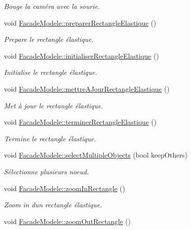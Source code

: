 \begin{DoxyCompactItemize}
\begin{DoxyCompactList}\small\item\em Bouge la caméra avec la sourie. \end{DoxyCompactList}\item 
void \hyperlink{group__inf2990_gaa5ea001f334158926e6c701478926ae9}{Facade\+Modele\+::preparer\+Rectangle\+Elastique} ()
\begin{DoxyCompactList}\small\item\em Prepare le rectangle élastique. \end{DoxyCompactList}\item 
void \hyperlink{group__inf2990_ga6ccf25bd92d3bae6dfeebaf051c768f4}{Facade\+Modele\+::initialiser\+Rectangle\+Elastique} ()
\begin{DoxyCompactList}\small\item\em Initialise le rectangle élastique. \end{DoxyCompactList}\item 
void \hyperlink{group__inf2990_ga382ae0540038d9ef65673af9d5d1b164}{Facade\+Modele\+::mettre\+A\+Jour\+Rectangle\+Elastique} ()
\begin{DoxyCompactList}\small\item\em Met à jour le rectangle élastique. \end{DoxyCompactList}\item 
void \hyperlink{group__inf2990_ga1c99d4d88f05b70a20b36b51c07f31cf}{Facade\+Modele\+::terminer\+Rectangle\+Elastique} ()
\begin{DoxyCompactList}\small\item\em Termine le rectangle élastique. \end{DoxyCompactList}\item 
void \hyperlink{group__inf2990_ga7cbdab19081ab5e385cff2862e0642cd}{Facade\+Modele\+::select\+Multiple\+Objects} (bool keep\+Others)
\begin{DoxyCompactList}\small\item\em Sélectionne plusieurs noeud. \end{DoxyCompactList}\item 
\hypertarget{group__inf2990_ga10c88f159ad8d8ff9b17927d7ca50a0e}{}void \hyperlink{group__inf2990_ga10c88f159ad8d8ff9b17927d7ca50a0e}{Facade\+Modele\+::zoom\+In\+Rectangle} ()\label{group__inf2990_ga10c88f159ad8d8ff9b17927d7ca50a0e}

\begin{DoxyCompactList}\small\item\em Zoom in d\textquotesingle{}un rectangle élastique. \end{DoxyCompactList}\item 
\hypertarget{group__inf2990_ga9b2a60b7b9392f6284e2fb7560e9c7f8}{}void \hyperlink{group__inf2990_ga9b2a60b7b9392f6284e2fb7560e9c7f8}{Facade\+Modele\+::zoom\+Out\+Rectangle} ()\label{group__inf2990_ga9b2a60b7b9392f6284e2fb7560e9c7f8}


\end{DoxyCompactItemize}
